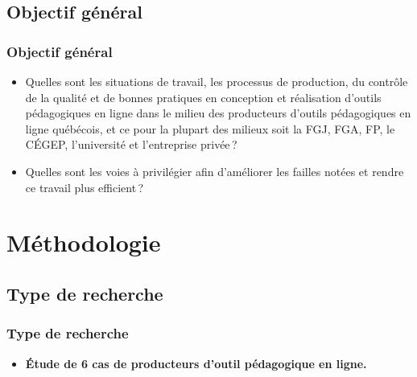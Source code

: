                 \subsection{Objectif général} 
		\begin{frame}
			\frametitle{Objectif général}
                        
                        \begin{itemize} 
                        \item  Quelles sont les situations de travail, les processus de production, du contrôle de la qualité et de bonnes pratiques en conception et réalisation d’outils pédagogiques en ligne dans le milieu des producteurs d’outils pédagogiques en ligne québécois, et ce pour la plupart des milieux soit la FGJ, FGA, FP, le CÉGEP, l’université et l’entreprise privée\,? 
                         \item Quelles sont les voies à privilégier afin d’améliorer les failles notées et rendre ce travail plus efficient\,?

                        \end{itemize}

             
                \end{frame}
                
	\section{Méthodologie} 
		
                        
				\subsection{Type de recherche} 
					\begin{frame}
						\frametitle{Type de recherche}
                        
                        			\begin{itemize} 
                       				 \item \textbf{Étude de 6 cas de producteurs d’outil pédagogique en ligne.} 

                       		 \end{itemize}
				\end{frame}
